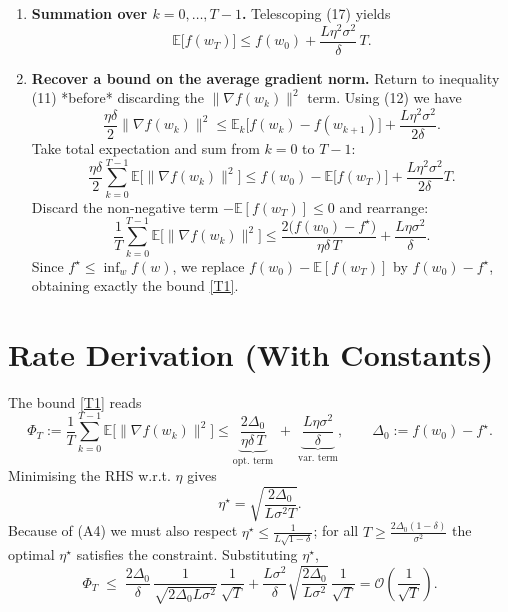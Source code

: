 \documentclass{article}
\newcommand{\E}{\mathbb{E}}
\begin{document}
\begin{enumerate}
\item[Step 13.] \textbf{Summation over $k=0,\dots,T-1$.}
Telescoping (17) yields
\[
\E\!\bigl[f(w_T)\bigr]
\le f(w_0)+\frac{L\eta^{2}\sigma^{2}}{\delta}\,T.
\tag{18}
\]

\item[Step 14.] \textbf{Recover a bound on the average gradient norm.}
Return to inequality (11) *before* discarding the $\|\nabla f(w_k)\|^{2}$ term.
Using (12) we have
\[
\frac{\eta\delta}{2}\|\nabla f(w_k)\|^{2}
\le \E_k\!\bigl[f(w_k)-f(w_{k+1})\bigr]
+\frac{L\eta^{2}\sigma^{2}}{2\delta}.
\tag{19}
\]
Take total expectation and sum from $k=0$ to $T-1$:
\[
\frac{\eta\delta}{2}\sum_{k=0}^{T-1}\E\!\bigl[\|\nabla f(w_k)\|^{2}\bigr]
\le f(w_0)-\E\!\bigl[f(w_T)\bigr]
+\frac{L\eta^{2}\sigma^{2}}{2\delta}T.
\tag{20}
\]
Discard the non‑negative term $-\E[f(w_T)]\le 0$ and rearrange:
\[
\frac1T\sum_{k=0}^{T-1}\E\!\bigl[\|\nabla f(w_k)\|^{2}\bigr]
\le
\frac{2\bigl(f(w_0)-f^{\star}\bigr)}{\eta\delta\,T}
+\frac{L\eta\sigma^{2}}{\delta}.
\tag{21}
\]
Since $f^{\star}\le \inf_{w}f(w)$, we replace $f(w_0)-\E[f(w_T)]$ by
$f(w_0)-f^{\star}$, obtaining exactly the bound \eqref{T1}.
\end{enumerate}

\section*{Rate Derivation (With Constants)}
The bound \eqref{T1} reads
\[
\Phi_T:=\frac1T\sum_{k=0}^{T-1}\E\!\bigl[\|\nabla f(w_k)\|^{2}\bigr]
\le
\underbrace{\frac{2\Delta_0}{\eta\delta\,T}}_{\text{opt. term}}
\;+\;
\underbrace{\frac{L\eta\sigma^{2}}{\delta}}_{\text{var. term}},
\qquad
\Delta_0:=f(w_0)-f^{\star}.
\]
Minimising the RHS w.r.t. $\eta$ gives
\[
\eta^{\star}= \sqrt{\frac{2\Delta_0}{L\sigma^{2}T}}.
\]
Because of (A4) we must also respect
$\eta^{\star}\le \frac{1}{L\sqrt{1-\delta}}$; for all $T\ge
\frac{2\Delta_0(1-\delta)}{\sigma^{2}}$ the optimal $\eta^{\star}$ satisfies the
constraint.  Substituting $\eta^{\star}$,
\[
\Phi_T\;\le\;
\frac{2\Delta_0}{\delta}\,\frac{1}{\sqrt{2\Delta_0 L\sigma^{2}}}\,\frac{1}{\sqrt{T}}
+\frac{L\sigma^{2}}{\delta}\sqrt{\frac{2\Delta_0}{L\sigma^{2}}}\,\frac{1}{\sqrt{T}}
= \mathcal O\!\left(\frac{1}{\sqrt{T}}\right).
\]
\end{document}
